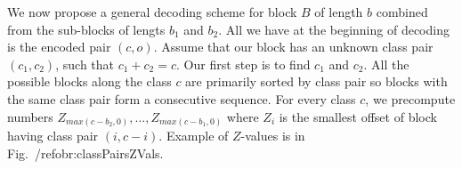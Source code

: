 


We now propose a general decoding scheme for block $B$ of length $b$ combined from the
sub-blocks of lengts $b_1$ and $b_2$. All we have at the beginning of decoding is the
encoded pair $(c, o)$. Assume that our block has an unknown class pair $(c_1, c_2)$,
such that $c_1+c_2=c$. Our first step is to find $c_1$ and $c_2$. All the possible
blocks along the class $c$ are primarily sorted by class pair so blocks with the same
class pair form a consecutive sequence. For every class $c$, we precompute numbers
$Z_{max(c-b_2, 0)},\ldots , Z_{max(c-b_1, 0)}$ where $Z_i$ is the smallest offset of
block having class pair $(i, c-i)$. Example of $Z$-values is in Fig.~/ref{obr:classPairsZVals}.

